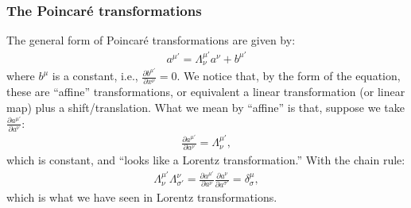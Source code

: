\documentclass{article}
\theoremstyle{definition}
\begin{document}
\subsubsection{The Poincar\'e transformations}
The general form of Poincar\'e transformations are given by:
\begin{align*}
\boxed{a^{\mu'} = \Lambda^{\mu'}_\nu a^{\nu} + b^{\mu'}}
\end{align*}
where $b^{\mu}$ is a constant, i.e., $\frac{\partial b^{\mu'}}{\partial x^\nu} = 0$. We notice that, by the form of the equation, these are ``affine'' transformations, or equivalent a linear transformation (or linear map) plus a shift/translation. What we mean by ``affine'' is that, suppose we take $\frac{\partial a^{\mu'}}{\partial a^\nu}$:
\begin{align*}
\frac{\partial a^{\mu'}}{\partial a^\nu} = \Lambda^{\mu'}_\nu,
\end{align*}
which is constant, and ``looks like a Lorentz transformation.'' With the chain rule:
\begin{align*}
\Lambda^{\mu'}_\nu \Lambda^\nu_{\sigma'} = \frac{\partial a^{\mu'}}{\partial a^\nu}\frac{\partial a^{\nu}}{\partial a^{\sigma'}} = \delta^{\mu}_\sigma,
\end{align*}
which is what we have seen in Lorentz transformations.\\
\end{document}
